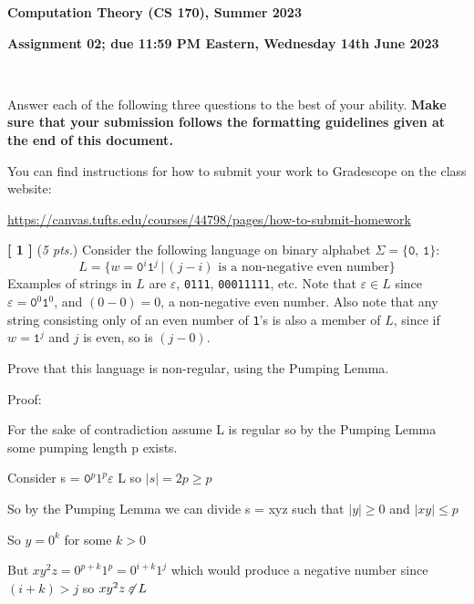 \documentclass[leqno,11pt]{article}
\newcommand{\set}[1]%
	{\ensuremath{ \{ #1 \} }}
\newcommand{\suth}{\ensuremath{ \,|\, }}
\newcommand{\qn}[1]%
	{\noindent \textbf{[ #1 ]}\quad}
\begin{document}
\begin{center}
{\large
\textbf{Computation Theory (CS 170), Summer 2023} \\
\rule{0pt}{1em} \textbf{Assignment 02; due 11:59 PM Eastern, Wednesday 14th June 2023}
}
\\
\hrulefill
\end{center}

\noindent 
Answer each of the following three questions to the best of your ability.  \textbf{Make sure that your
submission follows the formatting guidelines given at the end of this document.}

\vspace{4pt}\noindent 
You can find instructions for how to submit your work to Gradescope on the class website:
\begin{center}
	\href{https://canvas.tufts.edu/courses/44798/pages/how-to-submit-homework}
	{https://canvas.tufts.edu/courses/44798/pages/how-to-submit-homework}
\end{center}
 
\hrulefill 

\vspace{10pt}

\qn{1} (\emph{5 pts.}) Consider the following language on binary alphabet $\Sigma =
\set{\texttt{0},\, \texttt{1}}$:
\[
	L = \set{w = \texttt{0}^i \texttt{1}^j \suth (j - i) \text{ is a non-negative even number}} 
\]
Examples of strings in $L$ are $\varepsilon$, \texttt{0111}, \texttt{00011111}, etc. Note that $\varepsilon \in
L$ since $\varepsilon = \texttt{0}^0 \texttt{1}^0$, and $(0 - 0) = 0$, a non-negative even number.  Also note
that any string consisting only of an even number of \texttt{1}'s is also a member of $L$, since if 
$w = \texttt{1}^j$ and $j$ is even, so is $(j - 0)$.

\vspace{6pt} \noindent  
Prove that this language is non-regular, using the Pumping Lemma.



Proof:

For the sake of contradiction assume L is regular so by the Pumping Lemma some pumping length p exists.

Consider s = ${\texttt{0}^p{1}^p}\varepsilon$ L so ${|s| = 2p \geq p}$


So by the Pumping Lemma we can divide s = xyz such that ${|y| \geq 0}$ and ${|xy| \leq p}$

So ${y = 0^k}$ for some ${k > 0}$

But ${xy^2z = 0^{p+k}1^p = 0^{i+k}1^j}$ which would produce a negative number since ${(i+k) > j}$ so ${xy^2z \not\mathrel{\varepsilon} L}$
\end{document}
